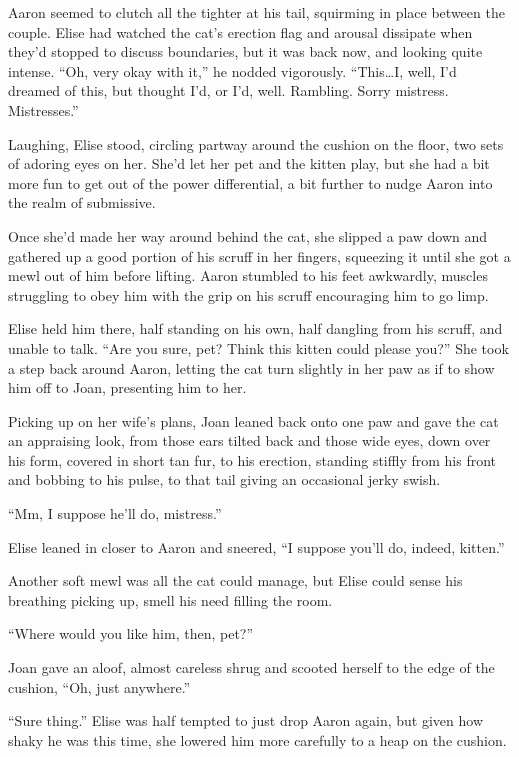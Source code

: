 Aaron seemed to clutch all the tighter at his tail, squirming in place between the couple. Elise had watched the cat's erection flag and arousal dissipate when they'd stopped to discuss boundaries, but it was back now, and looking quite intense. ``Oh, very okay with it,'' he nodded vigorously. ``This\ldots{}I, well, I'd dreamed of this, but thought I'd, or I'd, well. Rambling. Sorry mistress. Mistresses.''

Laughing, Elise stood, circling partway around the cushion on the floor, two sets of adoring eyes on her. She'd let her pet and the kitten play, but she had a bit more fun to get out of the power differential, a bit further to nudge Aaron into the realm of submissive.

Once she'd made her way around behind the cat, she slipped a paw down and gathered up a good portion of his scruff in her fingers, squeezing it until she got a mewl out of him before lifting. Aaron stumbled to his feet awkwardly, muscles struggling to obey him with the grip on his scruff encouraging him to go limp.

Elise held him there, half standing on his own, half dangling from his scruff, and unable to talk. ``Are you sure, pet? Think this kitten could please you?'' She took a step back around Aaron, letting the cat turn slightly in her paw as if to show him off to Joan, presenting him to her.

Picking up on her wife's plans, Joan leaned back onto one paw and gave the cat an appraising look, from those ears tilted back and those wide eyes, down over his form, covered in short tan fur, to his erection, standing stiffly from his front and bobbing to his pulse, to that tail giving an occasional jerky swish.

``Mm, I suppose he'll do, mistress.''

Elise leaned in closer to Aaron and sneered, ``I suppose you'll do, indeed, kitten.''

Another soft mewl was all the cat could manage, but Elise could sense his breathing picking up, smell his need filling the room.

``Where would you like him, then, pet?''

Joan gave an aloof, almost careless shrug and scooted herself to the edge of the cushion, ``Oh, just anywhere.''

``Sure thing.'' Elise was half tempted to just drop Aaron again, but given how shaky he was this time, she lowered him more carefully to a heap on the cushion.

